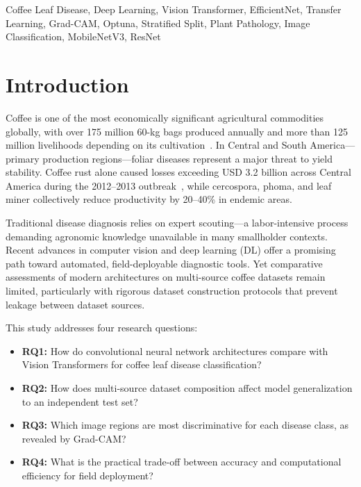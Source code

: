 \documentclass[conference]{IEEEtran}
\begin{document}
\begin{IEEEkeywords}
Coffee Leaf Disease, Deep Learning, Vision Transformer, EfficientNet,
Transfer Learning, Grad-CAM, Optuna, Stratified Split, Plant Pathology,
Image Classification, MobileNetV3, ResNet
\end{IEEEkeywords}

\section{Introduction}

Coffee is one of the most economically significant agricultural commodities
globally, with over 175 million 60-kg bags produced annually and more than
125 million livelihoods depending on its cultivation~\cite{ico2023}. In
Central and South America—primary production regions—foliar diseases
represent a major threat to yield stability. Coffee rust alone caused
losses exceeding USD 3.2 billion across Central America during the
2012--2013 outbreak~\cite{bebber2016}, while cercospora, phoma, and leaf
miner collectively reduce productivity by 20--40\% in endemic areas.

Traditional disease diagnosis relies on expert scouting—a labor-intensive
process demanding agronomic knowledge unavailable in many smallholder
contexts. Recent advances in computer vision and deep learning (DL) offer
a promising path toward automated, field-deployable diagnostic tools. Yet
comparative assessments of modern architectures on multi-source coffee
datasets remain limited, particularly with rigorous dataset construction
protocols that prevent leakage between dataset sources.

This study addresses four research questions:
\begin{itemize}
  \item \textbf{RQ1:} How do convolutional neural network architectures
    compare with Vision Transformers for coffee leaf disease classification?
  \item \textbf{RQ2:} How does multi-source dataset composition affect
    model generalization to an independent test set?
  \item \textbf{RQ3:} Which image regions are most discriminative for each
    disease class, as revealed by Grad-CAM?
  \item \textbf{RQ4:} What is the practical trade-off between accuracy and
    computational efficiency for field deployment?
\end{itemize}
\end{document}
